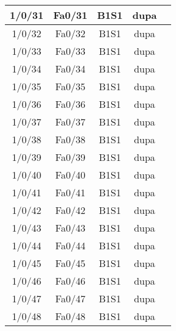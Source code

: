 \begin{center}
\begin{longtable}{|c|c|c|c|c|}
	1/0/31 & Fa0/31 & B1S1 & dupa \\ \hline
	1/0/32 & Fa0/32 & B1S1 & dupa \\ \hline
	1/0/33 & Fa0/33 & B1S1 & dupa \\ \hline
	1/0/34 & Fa0/34 & B1S1 & dupa \\ \hline
	1/0/35 & Fa0/35 & B1S1 & dupa \\ \hline
	1/0/36 & Fa0/36 & B1S1 & dupa \\ \hline
	1/0/37 & Fa0/37 & B1S1 & dupa \\ \hline
	1/0/38 & Fa0/38 & B1S1 & dupa \\ \hline
	1/0/39 & Fa0/39 & B1S1 & dupa \\ \hline
	1/0/40 & Fa0/40 & B1S1 & dupa \\ \hline
	1/0/41 & Fa0/41 & B1S1 & dupa \\ \hline
	1/0/42 & Fa0/42 & B1S1 & dupa \\ \hline
	1/0/43 & Fa0/43 & B1S1 & dupa \\ \hline
	1/0/44 & Fa0/44 & B1S1 & dupa \\ \hline
	1/0/45 & Fa0/45 & B1S1 & dupa \\ \hline
	1/0/46 & Fa0/46 & B1S1 & dupa \\ \hline
	1/0/47 & Fa0/47 & B1S1 & dupa \\ \hline
	1/0/48 & Fa0/48 & B1S1 & dupa \\ \hline

    \end{longtable}
\end{center}

